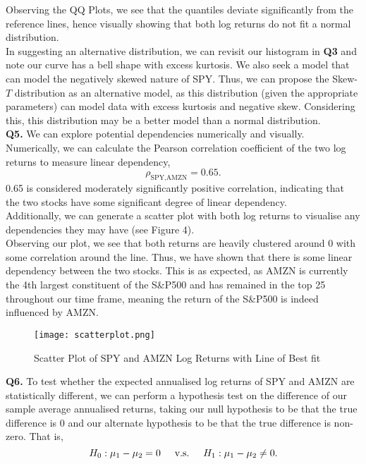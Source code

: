 \documentclass[twocolumn]{article}
\begin{document}
Observing the QQ Plots, we see that the quantiles deviate significantly from the reference lines, hence visually showing that both log returns do not fit a normal distribution. \\ 

In suggesting an alternative distribution, we can revisit our histogram in \textbf{Q3} and note our curve has a bell shape with excess kurtosis. We also seek a model that can model the negatively skewed nature of SPY. Thus, we can propose the Skew-$T$ distribution as an alternative model, as this distribution (given the appropriate parameters) can model data with excess kurtosis and negative skew. Considering this, this distribution may be a better model than a normal distribution. \\

\textbf{Q5.} We can explore potential dependencies numerically and visually. \\ 

Numerically, we can calculate the Pearson correlation coefficient of the two log returns to measure linear dependency,
$$\rho_{\text{SPY,AMZN}} = 0.65.$$
0.65 is considered moderately significantly positive correlation, indicating that the two stocks have some significant degree of linear dependency. \\

Additionally, we can generate a scatter plot with both log returns to visualise any dependencies they may have (see Figure 4). \\

Observing our plot, we see that both returns are heavily clustered around 0 with some correlation around the line. Thus, we have shown that there is some linear dependency between the two stocks. This is as expected, as AMZN is currently the 4th largest constituent of the S\&P500 and has remained in the top 25 throughout our time frame, meaning the return of the S\&P500 is indeed influenced by AMZN. \\

\newpage

\begin{figure}[htp]
    \centering
    \texttt{[image: scatterplot.png]}
    \caption{Scatter Plot of SPY and AMZN Log Returns with Line of Best fit}
    \label{fig:galaxy}
\end{figure}

\textbf{Q6.} To test whether the expected annualised log returns of SPY and AMZN are statistically different, we can perform a hypothesis test on the difference of our sample average annualised returns, taking our null hypothesis to be that the true difference is $0$ and our alternate hypothesis to be that the true difference is non-zero. That is,
$$
    H_0 : \mu_1 - \mu_2 = 0    \hspace{0.5cm} \text{v.s.} \hspace{0.5cm}
    H_1 : \mu_1 - \mu_2 \neq 0.
$$
\end{document}
